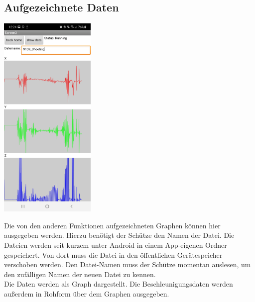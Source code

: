 \subsection{Aufgezeichnete Daten}
    \begin{minipage}{0.5\textwidth}
        \includegraphics[height=10cm]{Bilder/GraphRec.jpg}
    \end{minipage}
    \hfill
    \begin{minipage}{0.5\textwidth}
        Die von den anderen Funktionen aufgezeichneten Graphen können hier ausgegeben
        werden. Hierzu benötigt der Schütze den Namen der Datei. Die Dateien werden
        seit kurzem unter Android in einem App-eigenen Ordner gespeichert. Von dort muss 
        die Datei in den öffentlichen Gerätespeicher verschoben werden. Den Datei-Namen muss
        der Schütze momentan auslesen, um den zufälligen Namen der neuen Datei zu kennen.\\
        Die Daten werden als Graph dargestellt. Die Beschleunigungsdaten werden außerdem
        in Rohform über dem Graphen ausgegeben.\\
    \end{minipage}
